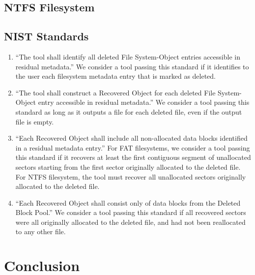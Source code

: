\documentclass{mcurcsm}
\begin{document}
\subsection{NTFS Filesystem}

\subsection{NIST Standards}
\begin{enumerate}
 \item ``The tool shall identify all deleted File System-Object entries accessible in residual metadata.''\cite{meta:dfr:standards}
 We consider a tool passing this standard if it identifies to the user each filesystem metadata entry that is marked as deleted.
 \item ``The tool shall construct a Recovered Object for each deleted File System-Object entry accessible in residual metadata.''\cite{meta:dfr:standards}
 We consider a tool passing this standard as long as it outputs a file for each deleted file, even if the output file is empty.
 \item ``Each Recovered Object shall include all non-allocated data blocks identified in a residual metadata entry.''\cite{meta:dfr:standards}
 For FAT filesystems, we consider a tool passing this standard if it recovers at least the first contiguous segment of unallocated sectors starting from the first sector originally allocated to the deleted file. For NTFS filesystem, the tool must recover all unallocated sectors originally allocated to the deleted file.
 \item ``Each Recovered Object shall consist only of data blocks from the Deleted Block Pool.''\cite{meta:dfr:standards}
 We consider a tool passing this standard if all recovered sectors were all originally allocated to the deleted file, and had not been reallocated to any other file.
\end{enumerate}







\section{Conclusion}

%
%
\end{document}
